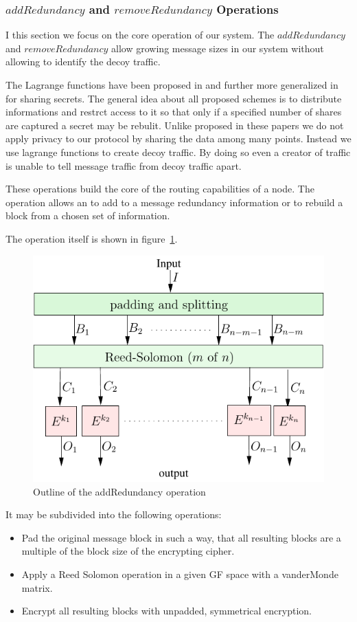 \subsubsection{$addRedundancy$ and $removeRedundancy$ Operations}
I this section we focus on the core operation of our system. The $addRedundancy$ and $removeRedundancy$ allow growing message sizes in our system without allowing to identify the decoy traffic. 

The Lagrange functions have been proposed in \cite{shamir1979share} and further more generalized in \cite{mceliece1981sharing} for sharing secrets. The general idea about all proposed schemes is to distribute informations and restrct access to it so that only if a specified number of shares are captured a secret may be rebulit. Unlike proposed in these papers we do not apply privacy to our protocol by sharing the data among many points. Instead we use lagrange functions to create decoy traffic. By doing so even a creator of traffic is unable to tell message traffic from decoy traffic apart. 

These operations build the core of the routing capabilities of a node. The operation allows an  to add to a message redundancy information or to rebuild a block from a chosen set of information. 

The operation itself is shown in figure~\ref{fig:addRedundancyOperation}. 
\begin{figure}[ht]\centering
	\includegraphics[width=0.8\columnwidth]{inc/addRedundancyOp}
	\caption{Outline of the addRedundancy operation}
	\label{fig:addRedundancyOperation}
\end{figure}

It may be subdivided into the following operations:
\begin{itemize}
	\item Pad the original message block in such a way, that all resulting blocks are a multiple of the block size of the encrypting cipher.
	\item Apply a Reed Solomon operation in a given GF space with a vanderMonde matrix.
	\item Encrypt all resulting blocks with unpadded, symmetrical encryption.
\end{itemize}

